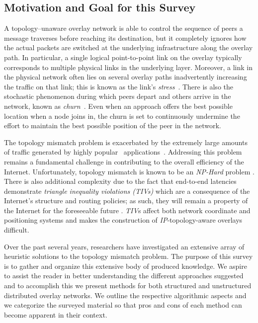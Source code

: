 \subsection{Motivation and Goal for this Survey}
A topology--unaware overlay network is able to control the sequence of peers a
message traverses before reaching its destination, but it completely ignores
how the actual packets are switched at the underlying infrastructure along
the overlay path. 
In particular, a single logical point-to-point link on the
overlay typically corresponds to multiple physical links in the
underlying layer. 
Moreover, a link in the physical network often lies
on several overlay paths inadvertently increasing the traffic on that
link; this is known as the link's \emph{stress}~\cite{CRSZ2002}. 
There is also the stochastic phenomenon during which peers 
depart and others arrive in the network, known 
as \emph{churn}~\cite{stutzbach_churn_2006}.
Even when an approach offers the best possible location
when a node joins in, the churn is set to  
continuously undermine the effort to maintain the best possible position
of the  peer in the network.

The topology mismatch problem is exacerbated by the extremely large amounts of
traffic generated by highly popular \p\ applications~\cite{byl-book}.
Addressing this problem remains a fundamental challenge 
in contributing to the overall efficiency of the Internet. 
Unfortunately, topology mismatch is known to be 
an \emph{NP-Hard} problem \cite{C2000,NPBOOK}. 
There is also additional complexity due to the fact that 
end-to-end latencies demonstrate \emph{triangle inequality
violations (TIVs)} which are a consequence of the Internet's structure and
routing policies; as such, they will remain a property of the Internet 
for the foreseeable future \cite{zheng_irprtt_2005}. 
\emph{TIV}s affect both network coordinate
\cite{cox_vivaldi_2004,wong_meridian_2005} and positioning \cite{ng_gnp_2001}
systems and makes the construction of \emph{IP}-topology-aware 
overlays difficult.

Over the past several years, researchers have investigated an extensive
array of heuristic solutions to the topology mismatch problem. 
The purpose of this survey is to gather and organize 
this extensive body of produced knowledge. 
We aspire to assist the reader in better understanding the 
different approaches suggested and to accomplish this we 
present methods for both structured and unstructured distributed 
overlay networks.
We outline the respective algorithmic aspects and we categorize
the surveyed material so that pros and cons of each method
can become apparent in their context.

